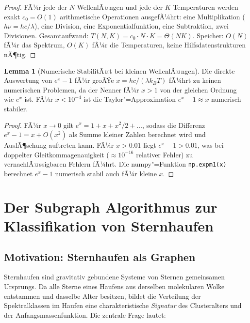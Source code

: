 ﻿\documentclass[a4paper,12pt]{article}
\theoremstyle{definition}
\newtheorem{lemma}{Lemma}
\begin{document}
\begin{proof}
    FÃ¼r jede der $N$ WellenlÃ¤ngen und jede der $K$ Temperaturen werden
    exakt $c_0 = O(1)$ arithmetische Operationen ausgefÃ¼hrt:
    eine Multiplikation ($h\nu = hc/\lambda$), eine Division, eine
    Exponentialfunktion, eine Subtraktion, zwei Divisionen.
    Gesamtaufwand: $T(N,K) = c_0 \cdot N \cdot K = \Theta(NK)$.
    Speicher: $O(N)$ fÃ¼r das Spektrum, $O(K)$ fÃ¼r die Temperaturen,
    keine Hilfsdatenstrukturen nÃ¶tig. \qedhere
\end{proof}

\begin{lemma}[Numerische StabilitÃ¤t bei kleinen WellenlÃ¤ngen]
    Die direkte Auswertung von $e^x - 1$ fÃ¼r groÃŸe $x = hc/(\lambda k_BT)$
    fÃ¼hrt zu keinen numerischen Problemen, da der Nenner fÃ¼r $x > 1$
    von der gleichen Ordnung wie $e^x$ ist. FÃ¼r $x < 10^{-4}$
    ist die Taylor"=Approximation $e^x - 1 \approx x$ numerisch stabiler.
\end{lemma}

\begin{proof}
    FÃ¼r $x \to 0$ gilt $e^x = 1 + x + x^2/2 + \ldots$, sodass
    die Differenz $e^x - 1 = x + O(x^2)$ als Summe kleiner Zahlen
    berechnet wird und AuslÃ¶schung auftreten kann.
    FÃ¼r $x > 0.01$ liegt $e^x - 1 > 0.01$, was bei doppelter
    Gleitkommagenauigkeit ($\approx 10^{-16}$ relativer Fehler) zu
    vernachlÃ¤ssigbaren Fehlern fÃ¼hrt. Die numpy"=Funktion
    \texttt{np.expm1(x)} berechnet $e^x - 1$ numerisch stabil
    auch fÃ¼r kleine $x$. \qedhere
\end{proof}

\section{Der Subgraph Algorithmus zur Klassifikation von Sternhaufen}

\subsection{Motivation: Sternhaufen als Graphen}

Sternhaufen sind gravitativ gebundene Systeme von Sternen gemeinsamen Ursprungs.
Da alle Sterne eines Haufens aus derselben molekularen Wolke entstammen und
dasselbe Alter besitzen, bildet die Verteilung der Spektralklassen im Haufen
eine charakteristische \emph{Signatur} des Clusteralters und der
Anfangsmassenfunktion. Die zentrale Frage lautet:
\end{document}
